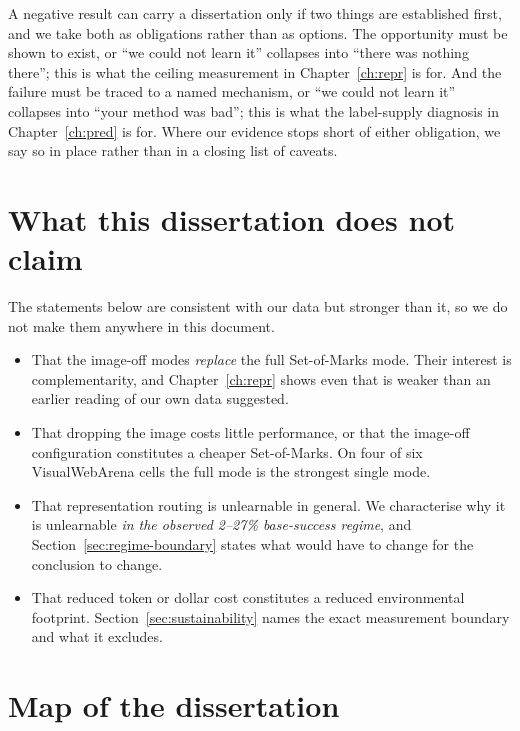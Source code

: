 A negative result can carry a dissertation only if two things are established
first, and we take both as obligations rather than as options. The opportunity
must be shown to exist, or ``we could not learn it'' collapses into ``there was
nothing there''; this is what the ceiling measurement in Chapter~\ref{ch:repr}
is for. And the failure must be traced to a named mechanism, or ``we could not
learn it'' collapses into ``your method was bad''; this is what the label-supply
diagnosis in Chapter~\ref{ch:pred} is for. Where our evidence stops short of
either obligation, we say so in place rather than in a closing list of caveats.

\FloatBarrier
\section{What this dissertation does not claim}
\label{sec:not-claimed}

The statements below are consistent with our data but stronger than it, so we do not make them anywhere in this document.

\begin{itemize}[leftmargin=1.5em]
\item That the image-off modes \emph{replace} the full Set-of-Marks mode. Their
      interest is complementarity, and Chapter~\ref{ch:repr} shows even that is
      weaker than an earlier reading of our own data suggested.
\item That dropping the image costs little performance, or that the image-off
      configuration constitutes a cheaper Set-of-Marks. On four of six
      VisualWebArena cells the full mode is the strongest single mode.
\item That representation routing is unlearnable in general. We characterise why
      it is unlearnable \emph{in the observed 2--27\% base-success regime}, and
      Section~\ref{sec:regime-boundary} states what would have to change for the
      conclusion to change.
\item That reduced token or dollar cost constitutes a reduced environmental
      footprint. Section~\ref{sec:sustainability} names the exact measurement
      boundary and what it excludes.
\end{itemize}

\FloatBarrier
\section{Map of the dissertation}
\label{sec:map}

